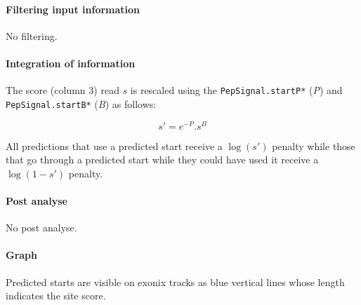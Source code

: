 \paragraph{Filtering input information}

No filtering.


\paragraph{Integration of information}

The score (column 3) read $s$ is rescaled using the {\tt PepSignal.startP*} 
(\emph{P}) and {\tt PepSignal.startB*} (\emph{B}) as follows:

\[s' = e^{-P}.s^B\]

All predictions that use a predicted start receive a $\log(s')$
penalty while those that go through a predicted start while they
could have used it receive a $\log(1-s')$ penalty.


\paragraph{Post analyse}

No post analyse.


\paragraph{Graph}

Predicted starts are visible on exonix tracks as blue vertical lines
whose length indicates the site score.

